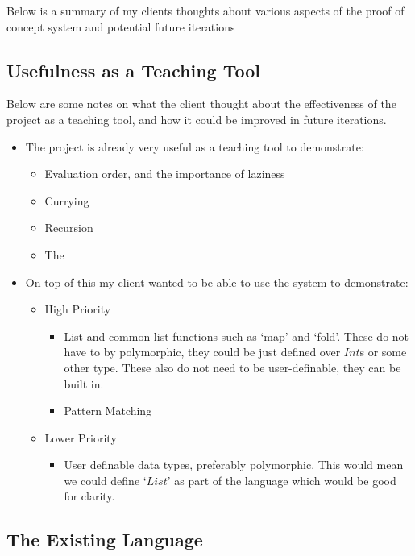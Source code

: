 Below is a summary of my clients thoughts about various aspects of the proof of concept system and potential future iterations

\subsection{Usefulness as a Teaching Tool}
Below are some notes on what the client thought about the effectiveness of the project as a teaching tool, and how it could be improved in future iterations.
\begin{itemize}
    \item The project is already very useful as a teaching tool to demonstrate:
    \begin{itemize}
        \item Evaluation order, and the importance of laziness
        \item Currying
        \item Recursion
        \item The \lcalc
    \end{itemize}

    \item On top of this my client wanted to be able to use the system to demonstrate: 
    \begin{itemize}
        \item High Priority
        \begin{itemize}
            \item List and common list functions such as `map' and `fold'. These do not have to by polymorphic, they could be just defined over $Int$s or some other type. These also do not need to be user-definable, they can be built in. 
            \item Pattern Matching
        \end{itemize}
        \item Lower Priority 
        \begin{itemize}
            \item User definable data types, preferably polymorphic. This would mean we could define `$List$' as part of the language which would be good for clarity. 
        \end{itemize}
    \end{itemize}
\end{itemize}

\subsection{The Existing Language}
